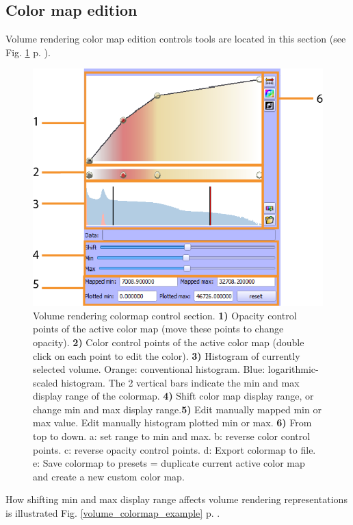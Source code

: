 \subsection{Color map edition}
Volume rendering color map edition controls tools are located in this section (see Fig. \ref{volume_colormap} p. \pageref{volume_colormap}). 
\begin{figure}
  \centering
  \includegraphics[scale=1]{images/14/volume_colormap2.png}
\caption{Volume rendering colormap control section. \textbf{1)} Opacity control points of the active color map (move these points to change opacity). \textbf{2)} Color control points of the active color map (double click on each point to edit the color). \textbf{3)} Histogram of currently selected volume. Orange: conventional histogram. Blue: logarithmic-scaled histogram. The 2 vertical bars indicate the min and max display range of the colormap.  \textbf{4)} Shift color map display range, or change min and max display range.\textbf{5)} Edit manually mapped min or max value. Edit manually histogram plotted min or max. \textbf{6)} From top to down. a: set range to min and max. b: reverse color control points. c: reverse opacity control points. d: Export colormap to file. e: Save colormap to presets = duplicate current active color map and create a new custom color map.}	
\label{volume_colormap}
 \end{figure}

 How shifting min and max display range affects volume rendering representations is illustrated Fig. \ref{volume_colormap_example} p. \pageref{volume_colormap_example}.

